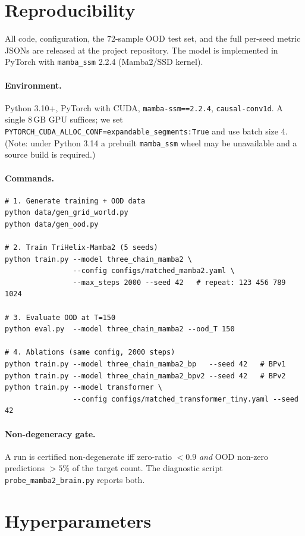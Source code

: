 \section{Reproducibility}
\label{app:repro}

All code, configuration, the 72-sample OOD test set, and the full per-seed
metric JSONs are released at the project repository. The model is implemented
in PyTorch with \texttt{mamba\_ssm} 2.2.4 (Mamba2/SSD kernel).

\paragraph{Environment.}
Python 3.10+, PyTorch with CUDA, \texttt{mamba-ssm==2.2.4},
\texttt{causal-conv1d}. A single 8\,GB GPU suffices; we set
\texttt{PYTORCH\_CUDA\_ALLOC\_CONF=expandable\_segments:True} and use batch
size 4. (Note: under Python 3.14 a prebuilt \texttt{mamba\_ssm} wheel may be
unavailable and a source build is required.)

\paragraph{Commands.}
\begin{verbatim}
# 1. Generate training + OOD data
python data/gen_grid_world.py
python data/gen_ood.py

# 2. Train TriHelix-Mamba2 (5 seeds)
python train.py --model three_chain_mamba2 \
                --config configs/matched_mamba2.yaml \
                --max_steps 2000 --seed 42   # repeat: 123 456 789 1024

# 3. Evaluate OOD at T=150
python eval.py  --model three_chain_mamba2 --ood_T 150

# 4. Ablations (same config, 2000 steps)
python train.py --model three_chain_mamba2_bp   --seed 42   # BPv1
python train.py --model three_chain_mamba2_bpv2 --seed 42   # BPv2
python train.py --model transformer \
                --config configs/matched_transformer_tiny.yaml --seed 42
\end{verbatim}

\paragraph{Non-degeneracy gate.}
A run is certified non-degenerate iff zero-ratio $<0.9$ \emph{and} OOD
non-zero predictions $>5\%$ of the target count. The diagnostic script
\texttt{probe\_mamba2\_brain.py} reports both.

\section{Hyperparameters}
\label{app:hyper}

